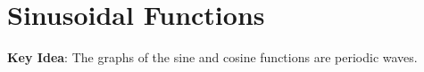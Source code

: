 \documentclass[main]{subfiles}
\begin{document}
\ifSubfilesClassLoaded{%
  \chaptermark{\chaptertwo}
}{}

\section{Sinusoidal Functions} \label{ws2-3}









\textbf{Key Idea}: The graphs of the sine and cosine functions are periodic waves.
\end{document}
